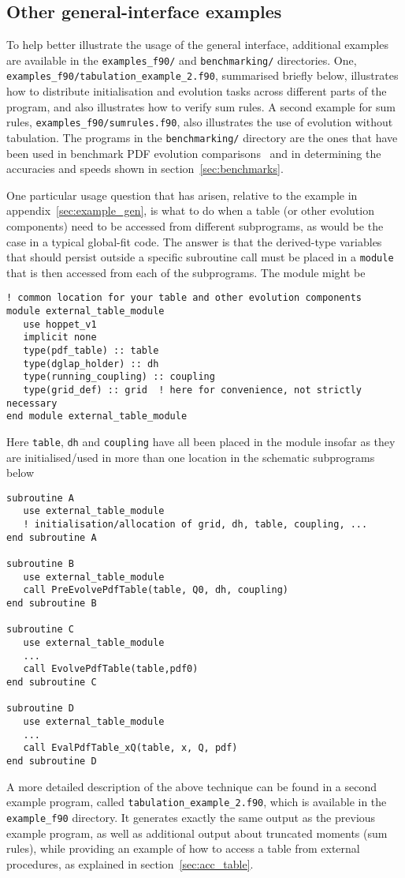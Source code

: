 \documentclass[12pt]{article}
\newcommand{\ttt}[1]{\texttt{#1}}
\begin{document}
\subsection{Other general-interface examples}

To help better illustrate the usage of the general interface,
additional examples are available in the \ttt{examples\_f90/} and
\ttt{benchmarking/} directories. One,
\ttt{examples\_f90/tabulation\_example\_2.f90}, summarised briefly
below, illustrates how to distribute initialisation and evolution
tasks across different parts of the program, and also illustrates how
to verify sum rules. A second example for sum rules,
\ttt{examples\_f90/sumrules.f90}, also illustrates the use of
evolution without tabulation.
%
The programs in the \ttt{benchmarking/} directory are the ones that
have been used in benchmark PDF evolution
comparisons~\cite{Benchmarks} and in determining the accuracies and
speeds shown in section~\ref{sec:benchmarks}.

One particular usage question that has arisen, relative to the example
in appendix~\ref{sec:example_gen}, is what to do when a table (or
other evolution components) need to be accessed from different
subprograms, as would be the case in a typical global-fit code.  The
answer is that the derived-type variables that should persist outside
a specific subroutine call must be placed in a \ttt{module} that is
then accessed from each of the subprograms. The module might be
\begin{lstlisting}
! common location for your table and other evolution components
module external_table_module 
   use hoppet_v1
   implicit none
   type(pdf_table) :: table
   type(dglap_holder) :: dh
   type(running_coupling) :: coupling
   type(grid_def) :: grid  ! here for convenience, not strictly necessary
end module external_table_module
\end{lstlisting}
Here \texttt{table}, \texttt{dh} and \ttt{coupling} have all been
placed in the module insofar as they are initialised/used in more than
one location in the schematic subprograms below
\begin{lstlisting}
subroutine A
   use external_table_module
   ! initialisation/allocation of grid, dh, table, coupling, ...
end subroutine A

subroutine B
   use external_table_module
   call PreEvolvePdfTable(table, Q0, dh, coupling)
end subroutine B

subroutine C
   use external_table_module
   ...
   call EvolvePdfTable(table,pdf0)
end subroutine C

subroutine D
   use external_table_module
   ...
   call EvalPdfTable_xQ(table, x, Q, pdf)
end subroutine D

\end{lstlisting}
%
A more detailed description of the above technique 
can be found in a 
second example program, called \ttt{tabulation\_example\_2.f90},
which is available in the \ttt{example\_f90} 
directory. It generates exactly
the same output as the previous example program, as well as additional
output about truncated moments (sum rules), while
providing an example of how to access a table from
external procedures, as explained in section~\ref{sec:acc_table}.
\end{document}
